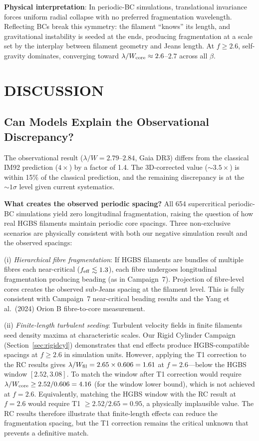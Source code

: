 \documentclass[twoside,twocolumn]{mnras}
\begin{document}
\textbf{Physical interpretation}: In periodic-BC simulations, translational invariance
forces uniform radial collapse with no preferred fragmentation wavelength. Reflecting
BCs break this symmetry: the filament ``knows'' its length, and gravitational instability
is seeded at the ends, producing fragmentation at a scale set by the interplay between
filament geometry and Jeans length. At $f \geq 2.6$, self-gravity dominates, converging
toward $\lambda/W_{\rm core} \approx 2.6$--$2.7$ across all $\beta$.

\section{DISCUSSION}
\label{sec:discussion}

\subsection{Can Models Explain the Observational Discrepancy?}

The observational result ($\lambda/W = 2.79$--$2.84$, Gaia DR3) differs from the classical
IM92 prediction ($4\times$) by a factor of 1.4. The 3D-corrected value (${\sim}3.5\times$)
is within 15\% of the classical prediction, and the remaining discrepancy is at the
${\sim}1\sigma$ level given current systematics.

\textbf{What creates the observed periodic spacing?} All 654 supercritical periodic-BC
simulations yield zero longitudinal fragmentation, raising the question of how real HGBS
filaments maintain periodic core spacings. Three non-exclusive scenarios are physically
consistent with both our negative simulation result and the observed spacings:

(i) \textit{Hierarchical fibre fragmentation}: If HGBS filaments are bundles of multiple
fibres each near-critical ($f_{\rm eff} \lesssim 1.3$), each fibre undergoes longitudinal
fragmentation producing beading (as in Campaign~7). Projection of fibre-level cores creates
the observed sub-Jeans spacing at the filament level. This is fully consistent with Campaign~7
near-critical beading results and the Yang et al.\ (2024) Orion B fibre-to-core measurement.

(ii) \textit{Finite-length turbulent seeding}: Turbulent velocity fields in finite
filaments seed density maxima at characteristic scales. Our Rigid Cylinder Campaign
(Section~\ref{sec:rigidcyl}) demonstrates that end effects produce HGBS-compatible spacings
at $f \geq 2.6$ in simulation units. However, applying the T1 correction to the
RC results gives $\lambda/W_{\rm fil} = 2.65 \times 0.606 = 1.61$ at $f = 2.6$---below
the HGBS window $[2.52, 3.08]$. To match the window after T1 correction would require
$\lambda/W_{\rm core} \geq 2.52/0.606 = 4.16$ (for the window lower bound), which
is not achieved at $f = 2.6$. Equivalently, matching the HGBS window with the RC
result at $f = 2.6$ would require T1 $\geq 2.52/2.65 = 0.95$, a physically
implausible value. The RC results therefore illustrate that finite-length effects can
reduce the fragmentation spacing, but the T1 correction remains the critical
unknown that prevents a definitive match.
\end{document}
